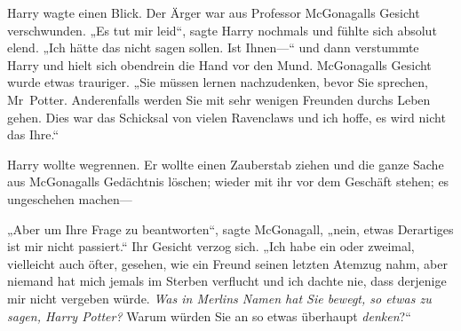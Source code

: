 Harry wagte einen Blick. Der Ärger war aus Professor McGonagalls Gesicht verschwunden. „Es tut mir leid“, sagte Harry nochmals und fühlte sich absolut elend. „Ich hätte das nicht sagen sollen. Ist Ihnen—“ und dann verstummte Harry und hielt sich obendrein die Hand vor den Mund. McGonagalls Gesicht wurde etwas trauriger. „Sie müssen lernen nachzudenken, bevor Sie sprechen, Mr~Potter. Anderenfalls werden Sie mit sehr wenigen Freunden durchs Leben gehen. Dies war das Schicksal von vielen Ravenclaws und ich hoffe, es wird nicht das Ihre.“

Harry wollte wegrennen. Er wollte einen Zauberstab ziehen und die ganze Sache aus McGonagalls Gedächtnis löschen; wieder mit ihr vor dem Geschäft stehen; es ungeschehen machen—

„Aber um Ihre Frage zu beantworten“, sagte McGonagall, „nein, etwas Derartiges ist mir nicht passiert.“ Ihr Gesicht verzog sich. „Ich habe ein oder zweimal, vielleicht auch öfter, gesehen, wie ein Freund seinen letzten Atemzug nahm, aber niemand hat mich jemals im Sterben verflucht und ich dachte nie, dass derjenige mir nicht vergeben würde. \emph{Was in Merlins Namen hat Sie bewegt, so etwas zu sagen, Harry Potter?} Warum würden Sie an so etwas überhaupt \emph{denken}?“

